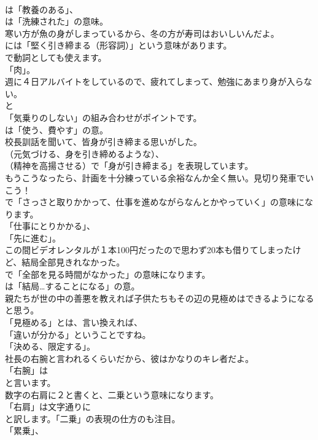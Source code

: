 \documentclass[8pt]{extreport}
\begin{document}
\begin{CJK}{UTF8}{min}
\\	は「教養のある」、
\\	は「洗練された」の意味。	
\\	寒い方が魚の身がしまっているから、冬の方が寿司はおいしいんだよ。 
\\	には「堅く引き締まる（形容詞）」という意味があります。
\\	で動詞としても使えます。
\\	「肉」。	
\\	週に４日アルバイトをしているので、疲れてしまって、勉強にあまり身が入らない。 
\\	と
\\	「気乗りのしない」の組み合わせがポイントです。
\\	は「使う、費やす」の意。	
\\	校長訓話を聞いて、皆身が引き締まる思いがした｡ 
\\	（元気づける、身を引き締めるような）、
\\	（精神を高揚させる）で「身が引き締まる」を表現しています。	
\\	もうこうなったら、計画を十分練っている余裕なんか全く無い。見切り発車でいこう！ 
\\	で「さっさと取りかかって、仕事を進めながらなんとかやっていく」の意味になります。
\\	「仕事にとりかかる」、
\\	「先に進む」。	
\\	この間ビデオレンタルが１本100円だったので思わず20本も借りてしまったけど、結局全部見きれなかった。 
\\	で「全部を見る時間がなかった」の意味になります。
\\	は「結局…することになる」の意。	
\\	親たちが世の中の善悪を教えれば子供たちもその辺の見極めはできるようになると思う。 
\\	「見極める」とは、言い換えれば、
\\	「違いが分かる」ということですね。
\\	「決める、限定する」。	
\\	社長の右腕と言われるくらいだから、彼はかなりのキレ者だよ。 
\\	「右腕」は
\\	と言います。	
\\	数字の右肩に２と書くと、二乗という意味になります。 
\\	「右肩」は文字通りに
\\	と訳します。「二乗」の表現の仕方のも注目。
\\	「累乗」、

\end{CJK}
\end{document}
